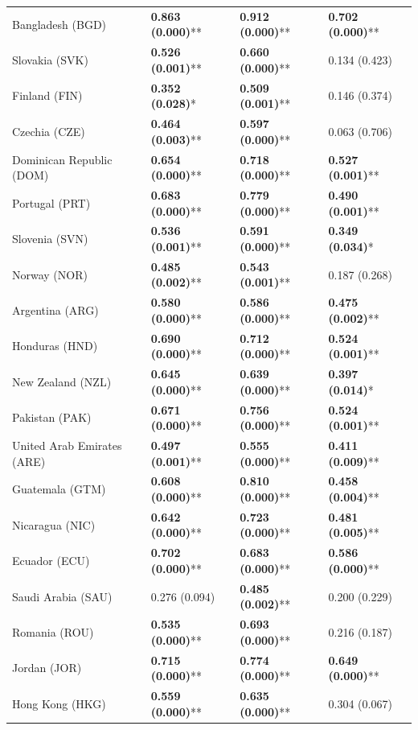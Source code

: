 \begin{longtable}{p{4cm}p{3cm}p{3cm}p{3cm}}
Bangladesh (BGD) & \textbf{0.863 (0.000)}** & \textbf{0.912 (0.000)}** & \textbf{0.702 (0.000)}** \\
Slovakia (SVK) & \textbf{0.526 (0.001)}** & \textbf{0.660 (0.000)}** & 0.134 (0.423) \\
Finland (FIN) & \textbf{0.352 (0.028)}* & \textbf{0.509 (0.001)}** & 0.146 (0.374) \\
Czechia (CZE) & \textbf{0.464 (0.003)}** & \textbf{0.597 (0.000)}** & 0.063 (0.706) \\
Dominican Republic (DOM) & \textbf{0.654 (0.000)}** & \textbf{0.718 (0.000)}** & \textbf{0.527 (0.001)}** \\
Portugal (PRT) & \textbf{0.683 (0.000)}** & \textbf{0.779 (0.000)}** & \textbf{0.490 (0.001)}** \\
Slovenia (SVN) & \textbf{0.536 (0.001)}** & \textbf{0.591 (0.000)}** & \textbf{0.349 (0.034)}* \\
Norway (NOR) & \textbf{0.485 (0.002)}** & \textbf{0.543 (0.001)}** & 0.187 (0.268) \\
Argentina (ARG) & \textbf{0.580 (0.000)}** & \textbf{0.586 (0.000)}** & \textbf{0.475 (0.002)}** \\
Honduras (HND) & \textbf{0.690 (0.000)}** & \textbf{0.712 (0.000)}** & \textbf{0.524 (0.001)}** \\
New Zealand (NZL) & \textbf{0.645 (0.000)}** & \textbf{0.639 (0.000)}** & \textbf{0.397 (0.014)}* \\
Pakistan (PAK) & \textbf{0.671 (0.000)}** & \textbf{0.756 (0.000)}** & \textbf{0.524 (0.001)}** \\
United Arab Emirates (ARE) & \textbf{0.497 (0.001)}** & \textbf{0.555 (0.000)}** & \textbf{0.411 (0.009)}** \\
Guatemala (GTM) & \textbf{0.608 (0.000)}** & \textbf{0.810 (0.000)}** & \textbf{0.458 (0.004)}** \\
Nicaragua (NIC) & \textbf{0.642 (0.000)}** & \textbf{0.723 (0.000)}** & \textbf{0.481 (0.005)}** \\
Ecuador (ECU) & \textbf{0.702 (0.000)}** & \textbf{0.683 (0.000)}** & \textbf{0.586 (0.000)}** \\
Saudi Arabia (SAU) & 0.276 (0.094) & \textbf{0.485 (0.002)}** & 0.200 (0.229) \\
Romania (ROU) & \textbf{0.535 (0.000)}** & \textbf{0.693 (0.000)}** & 0.216 (0.187) \\
Jordan (JOR) & \textbf{0.715 (0.000)}** & \textbf{0.774 (0.000)}** & \textbf{0.649 (0.000)}** \\
Hong Kong (HKG) & \textbf{0.559 (0.000)}** & \textbf{0.635 (0.000)}** & 0.304 (0.067) \\

\end{longtable}
